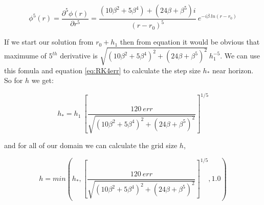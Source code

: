 \begin{equation} \label{eq:nearhorizon5thdervitaive}
    \phi^{5}(r) = \frac{\partial^5\phi(r)}{\partial r^5} = \frac{(10\beta^2+5\beta^4) + (24\beta+\beta^5)i}{(r-r_0)^5}~e^{-i\beta~ln(r-r_0)}
\end{equation}

If we start our solution from $r_0+h_1$ then from equation \label{eq:nearhorizon5thdervitaive} it would be obvious that maximume of $5^{th}$ derivative is $\sqrt{(10\beta^2+5\beta^4)^2 + (24\beta+\beta^5)^2}~h_1^{-5}$. We can use this fomula and equation \ref{eq:RK4err} to calculate the step size $h_*$ near horizon. So for $h$ we get:

\begin{equation}
    h_* = h_1~\left[\frac{120~err}{\sqrt{(10\beta^2+5\beta^4)^2 + (24\beta+\beta^5)^2}}\right]^{1/5}
\end{equation}

and for all of our domain we can calculate the grid size $h$,

\begin{equation}
    h = min(h_* , \left[\frac{120~err}{\sqrt{(10\beta^2+5\beta^4)^2 + (24\beta+\beta^5)^2}}\right]^{1/5} , 1.0)
\end{equation}
